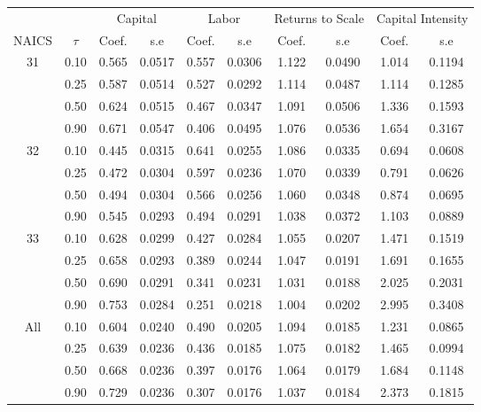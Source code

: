 \begin{table}[H]
\centering
\begin{tabular}{cccccccccc}
  \hline\hline & & \multicolumn{2}{c}{Capital}  & \multicolumn{2}{c}{Labor} & \multicolumn{2}{c}{Returns to Scale} & \multicolumn{2}{c}{Capital Intensity}\\ \cmidrule(lr){3-4} \cmidrule(lr){5-6} \cmidrule(lr){7-8} \cmidrule(lr){9-10}NAICS & $\tau$ & Coef. & s.e & Coef. & s.e & Coef. & s.e & Coef. & s.e \\ 
  \hline
31 & 0.10 & 0.565 & 0.0517 & 0.557 & 0.0306 & 1.122 & 0.0490 & 1.014 & 0.1194 \\ 
   & 0.25 & 0.587 & 0.0514 & 0.527 & 0.0292 & 1.114 & 0.0487 & 1.114 & 0.1285 \\ 
   & 0.50 & 0.624 & 0.0515 & 0.467 & 0.0347 & 1.091 & 0.0506 & 1.336 & 0.1593 \\ 
   & 0.90 & 0.671 & 0.0547 & 0.406 & 0.0495 & 1.076 & 0.0536 & 1.654 & 0.3167 \\ 
  32 & 0.10 & 0.445 & 0.0315 & 0.641 & 0.0255 & 1.086 & 0.0335 & 0.694 & 0.0608 \\ 
   & 0.25 & 0.472 & 0.0304 & 0.597 & 0.0236 & 1.070 & 0.0339 & 0.791 & 0.0626 \\ 
   & 0.50 & 0.494 & 0.0304 & 0.566 & 0.0256 & 1.060 & 0.0348 & 0.874 & 0.0695 \\ 
   & 0.90 & 0.545 & 0.0293 & 0.494 & 0.0291 & 1.038 & 0.0372 & 1.103 & 0.0889 \\ 
  33 & 0.10 & 0.628 & 0.0299 & 0.427 & 0.0284 & 1.055 & 0.0207 & 1.471 & 0.1519 \\ 
   & 0.25 & 0.658 & 0.0293 & 0.389 & 0.0244 & 1.047 & 0.0191 & 1.691 & 0.1655 \\ 
   & 0.50 & 0.690 & 0.0291 & 0.341 & 0.0231 & 1.031 & 0.0188 & 2.025 & 0.2031 \\ 
   & 0.90 & 0.753 & 0.0284 & 0.251 & 0.0218 & 1.004 & 0.0202 & 2.995 & 0.3408 \\ 
  All & 0.10 & 0.604 & 0.0240 & 0.490 & 0.0205 & 1.094 & 0.0185 & 1.231 & 0.0865 \\ 
   & 0.25 & 0.639 & 0.0236 & 0.436 & 0.0185 & 1.075 & 0.0182 & 1.465 & 0.0994 \\ 
   & 0.50 & 0.668 & 0.0236 & 0.397 & 0.0176 & 1.064 & 0.0179 & 1.684 & 0.1148 \\ 
   & 0.90 & 0.729 & 0.0236 & 0.307 & 0.0176 & 1.037 & 0.0184 & 2.373 & 0.1815 \\ 
   \hline
\end{tabular}
\end{table}
